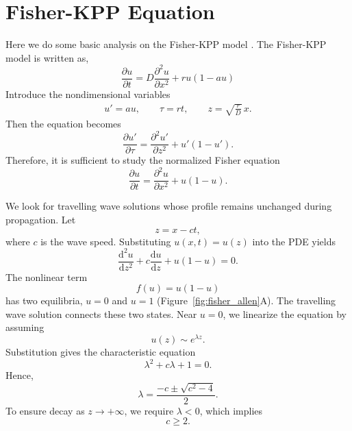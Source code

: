 \section{Fisher-KPP Equation}

Here we do some basic analysis on the Fisher-KPP model \citep{fisher_wave_1937}. The Fisher-KPP model is written as,
\begin{equation*}
    \frac{\partial u}{\partial t}
    =
    D \frac{\partial^2 u}{\partial x^2}
    +
    r u (1-au)
\end{equation*}
Introduce the nondimensional variables
\begin{align*}
    u' = au,\qquad  \tau = rt,  \qquad  z = \sqrt{\frac{r}{D}}\,x.
\end{align*}
Then the equation becomes
\begin{equation*}
    \frac{\partial u'}{\partial \tau}
    =
    \frac{\partial^2 u'}{\partial z^2}
    +
    u'(1-u').
\end{equation*}
Therefore, it is sufficient to study the normalized Fisher equation
\begin{equation*}
    \frac{\partial u}{\partial t}
    =
    \frac{\partial^2 u}{\partial x^2}
    +
    u(1-u).
\end{equation*}

We look for travelling wave solutions whose profile remains unchanged during propagation. Let
\begin{equation*}
    z = x-ct,
\end{equation*}
where $c$ is the wave speed. Substituting $u(x,t)=u(z)$ into the PDE yields
\begin{equation*}
    \frac{\mathrm{d}^2u}{\mathrm{d}z^2}
    +
    c\frac{\mathrm{d}u}{\mathrm{d}z}
    +
    u(1-u)
    =
    0.
\end{equation*}
The nonlinear term
\begin{equation*}
    f(u)=u(1-u)
\end{equation*}
has two equilibria, $u=0$ and $u=1$ (Figure~\ref{fig:fisher_allen}A). The travelling wave solution connects these two states. Near $u=0$, we linearize the equation by assuming
\begin{equation*}
    u(z)\sim e^{\lambda z}.
\end{equation*}
Substitution gives the characteristic equation
\begin{equation*}
    \lambda^2 + c\lambda + 1 = 0.
\end{equation*}
Hence,
\begin{equation*}
    \lambda
=
\frac{-c \pm \sqrt{c^2-4}}{2}.
\end{equation*}
To ensure decay as $z\to+\infty$, we require $\lambda<0$, which implies
\begin{equation*}
    c \ge 2.
\end{equation*}

